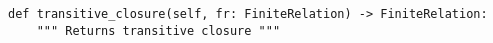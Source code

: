 \begin{verbatim}
def transitive_closure(self, fr: FiniteRelation) -> FiniteRelation:
    """ Returns transitive closure """
\end{verbatim}